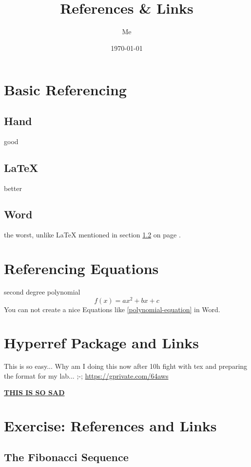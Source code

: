 \documentclass[12pt, titlepage]{article}
\title{References \& Links}
\author{Me}
\date{\today}
\begin{document}
\maketitle

\newpage
\tableofcontents
\newpage

\section{Basic Referencing}
\subsection{Hand}
good

\subsection{LaTeX} \label{LaTeX-section} %
better

\subsection{Word}
the worst, unlike LaTeX mentioned in section \ref{LaTeX-section} on page \pageref{LaTeX-section}.

\section{Referencing Equations}
second degree polynomial
\begin{equation} %
    \label{polynomial-equation}
    f(x) = ax^{2} + bx + c
\end{equation}
You can not create a nice Equations like \eqref{polynomial-equation} in Word.

\section{Hyperref Package and Links}
This is so easy... Why am I doing this now after 10h fight with tex and preparing the format for my lab... ;-; \url{https://gprivate.com/64aws}

\href{https://gprivate.com/64aws}{\textbf{THIS IS SO SAD}}

\section{Exercise: References and Links}

\subsection{The Fibonacci Sequence}
\end{document}
